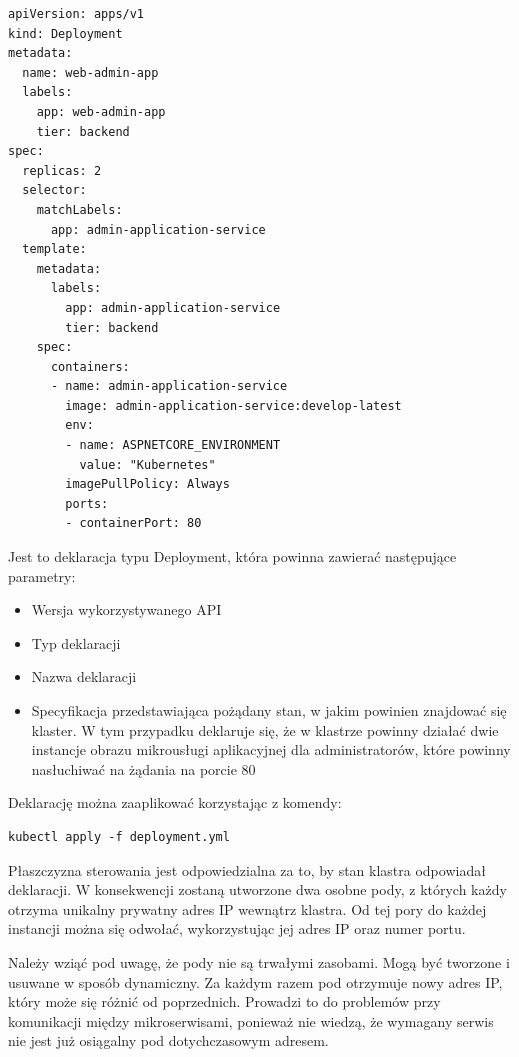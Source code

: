 \documentclass[11pt, a4]{article} %
\begin{document}
\begin{lstlisting}
apiVersion: apps/v1
kind: Deployment
metadata:
  name: web-admin-app
  labels:
    app: web-admin-app
    tier: backend
spec:
  replicas: 2
  selector:
    matchLabels:
      app: admin-application-service
  template:
    metadata:
      labels:
        app: admin-application-service
        tier: backend
    spec:
      containers:
      - name: admin-application-service
        image: admin-application-service:develop-latest
        env:
        - name: ASPNETCORE_ENVIRONMENT
          value: "Kubernetes"
        imagePullPolicy: Always
        ports:
        - containerPort: 80

\end{lstlisting}

Jest to deklaracja typu Deployment, która powinna zawierać następujące parametry:

\begin{itemize} %
    \item Wersja wykorzystywanego API
    \item Typ deklaracji
    \item Nazwa deklaracji
    \item Specyfikacja przedstawiająca pożądany stan, w jakim powinien znajdować się 
    klaster. W tym przypadku deklaruje się, że w klastrze powinny działać dwie 
    instancje obrazu mikrousługi aplikacyjnej dla administratorów, które powinny 
    nasłuchiwać na żądania na porcie 80
\end{itemize}

Deklarację można zaaplikować korzystając z komendy:

\begin{lstlisting}
kubectl apply -f deployment.yml
\end{lstlisting}

Płaszczyzna sterowania jest odpowiedzialna za to, by stan klastra odpowiadał 
deklaracji. W konsekwencji zostaną utworzone dwa osobne pody, z których każdy otrzyma 
unikalny prywatny adres IP wewnątrz klastra. Od tej pory do każdej instancji można 
się odwołać, wykorzystując jej adres IP oraz numer portu.

Należy wziąć pod uwagę, że pody nie są trwałymi zasobami. Mogą być tworzone i usuwane 
w sposób dynamiczny. Za każdym razem pod otrzymuje nowy adres IP, który może się 
różnić od poprzednich. Prowadzi to do problemów przy komunikacji między 
mikroserwisami, ponieważ nie wiedzą, że wymagany serwis nie jest już osiągalny pod 
dotychczasowym adresem.
\end{document}
